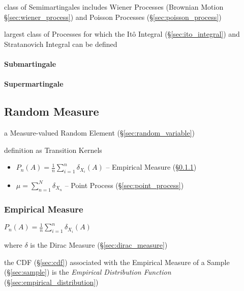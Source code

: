 class of Semimartingales includes Wiener Processes (Brownian Motion
\S\ref{sec:wiener_process}) and Poisson Processes
(\S\ref{sec:poisson_process})

largest class of Processes for which the It\^o Integral
(\S\ref{sec:ito_integral}) and Stratanovich Integral can be defined



\paragraph{Submartingale}\label{sec:submartingale}\hfill

\paragraph{Supermartingale}\label{sec:supermartingale}\hfill



\subsection{Random Measure}\label{sec:random_measure}

a Measure-valued Random Element (\S\ref{sec:random_variable})

definition as Transition Kernels

\begin{itemize}
  \item $P_n(A) = \frac{1}{n}\sum_{i=1}^n \delta_{X_i}(A)$ --
    Empirical Measure (\S\ref{sec:empirical_measure})
  \item $\mu = \sum_{n=1}^N \delta_{X_n}$ -- Point Process
    (\S\ref{sec:point_process})
\end{itemize}



\subsubsection{Empirical Measure}\label{sec:empirical_measure}

$P_n(A) = \frac{1}{n}\sum_{i=1}^n \delta_{X_i}(A)$

where $\delta$ is the Dirac Measure (\S\ref{sec:dirac_measure})

the CDF (\S\ref{sec:cdf}) associated with the Empirical Measure of a Sample
(\S\ref{sec:sample}) is the \emph{Empirical Distribution Function}
(\S\ref{sec:empirical_distribution})



